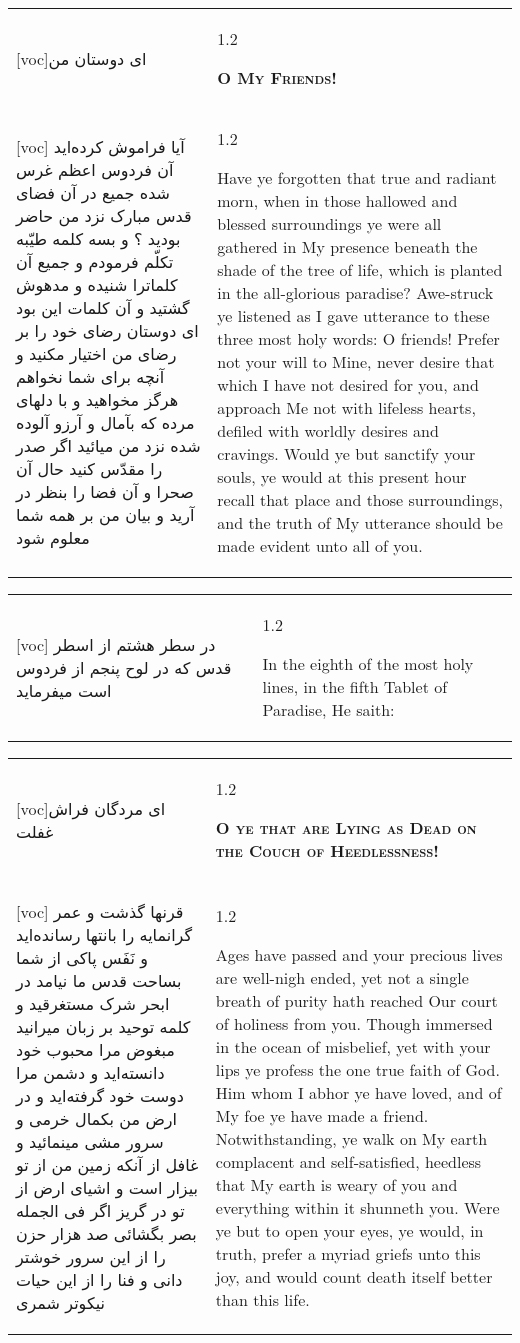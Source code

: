 \documentclass[11pt]{article}
\makeatletter
\newenvironment{orig}
  {\begin{farsi}[voc]}
  {\end{farsi}}
\newenvironment{trans}
  {\Large\begin{spacing}{1.2}\raggedright}
  {\end{spacing}}
\newenvironment{word}
  {\begin{tabular}[t]{p{2.75in}@{\hspace{3em}}p{2.75in}}}
  {\end{tabular}}
\newcommand{\ayat}[2]{\begin{orig}#1\end{orig} & \begin{trans}#2\end{trans}}
\newcommand{\heading}[2]{\textsc{\textbf{#1}} %
}
\makeatother
\begin{document}
\pagebreak

\begin{word}
\ayat{ای دوستان من}{\heading{O My Friends!}{}} \\ \ayat{
آيا فراموش کرده‌ايد آن فردوس اعظم غرس شده جميع در آن فضای قدس مبارک نزد من حاضر بوديد ؟ و بسه کلمه طيّبه تکلّم فرمودم و جميع آن کلماترا شنيده و مدهوش گشتيد و آن کلمات اين بود ای دوستان رضای خود را بر رضای من اختيار مکنيد و آنچه برای شما نخواهم هرگز مخواهيد و با دلهای مرده که بآمال و آرزو آلوده شده نزد من ميائيد اگر صدر را مقدّس کنيد حال آن صحرا و آن فضا را بنظر در آريد و بيان من بر همه شما معلوم شود
}{
  Have ye forgotten that true and radiant morn, when in those hallowed and
  blessed surroundings ye were all gathered in My presence beneath the shade
  of the tree of life, which is planted in the all-glorious paradise?
  Awe-struck ye listened as I gave utterance to these three most holy words: O
  friends! Prefer not your will to Mine, never desire that which I have not
  desired for you, and approach Me not with lifeless hearts, defiled with
  worldly desires and cravings. Would ye but sanctify your souls, ye would at
  this present hour recall that place and those surroundings, and the truth of
  My utterance should be made evident unto all of you.
}
\end{word}

\pagebreak

\begin{word}
\ayat{
در سطر هشتم از اسطر قدس که در لوح پنجم از فردوس است ميفرمايد
}{
In the eighth of the most holy lines, in the fifth Tablet of Paradise, He saith:
}
\end{word}

\pagebreak

\begin{word}
\ayat{ای مردگان فراش غفلت}{\heading{O ye that are Lying as Dead on the Couch of Heedlessness!}{}} \\ \ayat{
قرنها گذشت و عمر گرانمايه را بانتها رسانده‌ايد و نَفَس پاکی از شما بساحت قدس ما نيامد
در ابحر شرک مستغرقيد و کلمه توحيد بر زبان ميرانيد
مبغوض مرا محبوب خود دانسته‌ايد و دشمن مرا دوست خود گرفته‌ايد و در ارض من بکمال خرمی و سرور مشی مينمائيد و غافل از آنکه زمين من از تو بيزار است و اشيای ارض از تو در گريز
اگر فی الجمله بصر بگشائی صد هزار حزن را از اين سرور خوشتر دانی و فنا را از اين حيات نيکوتر شمری
}{
  Ages have passed and your precious lives are well-nigh ended, yet not a
  single breath of purity hath reached Our court of holiness from you. Though
  immersed in the ocean of misbelief, yet with your lips ye profess the one
  true faith of God. Him whom I abhor ye have loved, and of My foe ye have
  made a friend. Notwithstanding, ye walk on My earth complacent and
  self-satisfied, heedless that My earth is weary of you and everything within
  it shunneth you. Were ye but to open your eyes, ye would, in truth, prefer a
  myriad griefs unto this joy, and would count death itself better than this
  life.
}
\end{word}
\end{document}
